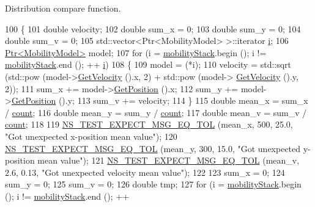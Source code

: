 Distribution compare function. 


\begin{DoxyCode}
100 \{
101   \textcolor{keywordtype}{double} velocity;
102   \textcolor{keywordtype}{double} sum\_x = 0;
103   \textcolor{keywordtype}{double} sum\_y = 0;
104   \textcolor{keywordtype}{double} sum\_v = 0;
105   std::vector<Ptr<MobilityModel> >::iterator \hyperlink{bernuolliDistribution_8m_a6f6ccfcf58b31cb6412107d9d5281426}{i};
106   \hyperlink{classns3_1_1Ptr}{Ptr<MobilityModel>} model;
107   \textcolor{keywordflow}{for} (i = \hyperlink{classSteadyStateRandomWaypointTest_a492bad1d2d921f57ea65e92e12dc3d8a}{mobilityStack}.begin (); i != \hyperlink{classSteadyStateRandomWaypointTest_a492bad1d2d921f57ea65e92e12dc3d8a}{mobilityStack}.end (); ++
      \hyperlink{bernuolliDistribution_8m_a6f6ccfcf58b31cb6412107d9d5281426}{i})
108     \{
109       model = (*i);
110       velocity = std::sqrt (std::pow (model->\hyperlink{classns3_1_1MobilityModel_a77004c56b45773bf57bdd3750887ced3}{GetVelocity} ().x, 2) + std::pow (model->
      \hyperlink{classns3_1_1MobilityModel_a77004c56b45773bf57bdd3750887ced3}{GetVelocity} ().y, 2));
111       sum\_x += model->\hyperlink{classns3_1_1MobilityModel_aba838f06ec5bbb2d193d94b8c0e4abb4}{GetPosition} ().x;
112       sum\_y += model->\hyperlink{classns3_1_1MobilityModel_aba838f06ec5bbb2d193d94b8c0e4abb4}{GetPosition} ().y;
113       sum\_v += velocity;
114     \}
115   \textcolor{keywordtype}{double} mean\_x = sum\_x / \hyperlink{classSteadyStateRandomWaypointTest_a48ac9d867be62c0407cbf2e8c3ad5e1b}{count};
116   \textcolor{keywordtype}{double} mean\_y = sum\_y / \hyperlink{classSteadyStateRandomWaypointTest_a48ac9d867be62c0407cbf2e8c3ad5e1b}{count};
117   \textcolor{keywordtype}{double} mean\_v = sum\_v / \hyperlink{classSteadyStateRandomWaypointTest_a48ac9d867be62c0407cbf2e8c3ad5e1b}{count};
118 
119   \hyperlink{group__testing_ga7927b376d1fed5e576c7a3d69d26e8a0}{NS\_TEST\_EXPECT\_MSG\_EQ\_TOL} (mean\_x, 500, 25.0, \textcolor{stringliteral}{"Got unexpected x-position mean
       value"});
120   \hyperlink{group__testing_ga7927b376d1fed5e576c7a3d69d26e8a0}{NS\_TEST\_EXPECT\_MSG\_EQ\_TOL} (mean\_y, 300, 15.0, \textcolor{stringliteral}{"Got unexpected y-position mean
       value"});
121   \hyperlink{group__testing_ga7927b376d1fed5e576c7a3d69d26e8a0}{NS\_TEST\_EXPECT\_MSG\_EQ\_TOL} (mean\_v, 2.6, 0.13, \textcolor{stringliteral}{"Got unexpected velocity mean
       value"});
122 
123   sum\_x = 0;
124   sum\_y = 0;
125   sum\_v = 0;
126   \textcolor{keywordtype}{double} tmp;
127   \textcolor{keywordflow}{for} (i = \hyperlink{classSteadyStateRandomWaypointTest_a492bad1d2d921f57ea65e92e12dc3d8a}{mobilityStack}.begin (); i != \hyperlink{classSteadyStateRandomWaypointTest_a492bad1d2d921f57ea65e92e12dc3d8a}{mobilityStack}.end (); ++

\end{DoxyCode}
